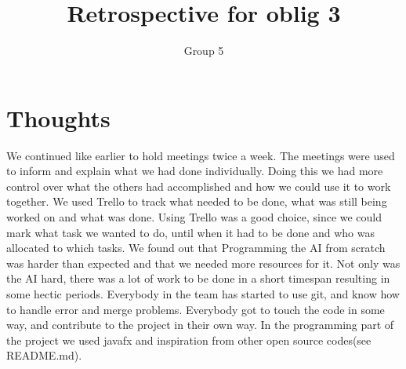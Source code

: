 \documentclass{article}
\title{Retrospective for oblig 3}
\author{Group 5}
\date{}
\begin{document}
    \maketitle

    \section{Thoughts}
    \noindent
     We continued like earlier to hold meetings twice a week. The meetings were used to inform and explain what we had
     done individually. Doing this we had more control over what the others had accomplished and how we could use it to work together.
     We used Trello to track what needed to be done, what was still being worked on and what was done. Using Trello was a good choice, since we could mark what task we
     wanted to do, until when it had to be done and who was allocated to which tasks. We found out that Programming the AI from scratch was harder than expected
     and that we needed more resources for it. Not only was the AI hard, there was a lot of work to be done in a short timespan
     resulting in some hectic periods. Everybody in the team has started to use git, and know how to handle error and merge problems.
     Everybody got to touch the code in some way, and contribute to the project in their own way. In the programming part of the project
     we used javafx and inspiration from other open source codes(see README.md). 
\end{document}
